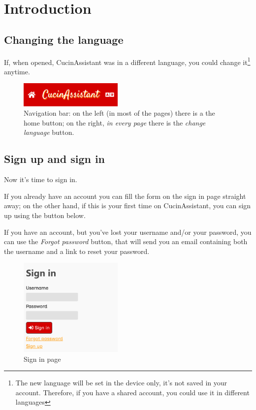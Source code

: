 \documentclass[12pt, a4paper]{report}
\begin{document}
    \chapter{Introduction}

    \section{Changing the language} \label{changelang}

    If, when opened, CucinAssistant was in a different language, you could change it\footnote{The new language will be set in the device only, it's
    not saved in your account. Therefore, if you have a shared account, you could use it in different languages} anytime.

    \begin{figure}[H]
        \centering
        \includegraphics[width=0.45\textwidth]{assets/nav.png}
        \caption{Navigation bar: on the left (in most of the pages) there is a the home button; on the right, \emph{in every page} there is the
        \emph{change language} button.}
    \end{figure}

    \section{Sign up and sign in}

    Now it's time to sign in.

    If you already have an account you can fill the form on the sign in page straight away; on the other hand, if this is your first time on
    CucinAssistant, you can sign up using the button below.

    If you have an account, but you've lost your username and/or your password, you can use the \emph{Forgot password} button, that will send you an
    email containing both the username and a link to reset your password.

    \begin{figure}[H]
        \centering
        \includegraphics[width=0.45\textwidth]{assets/en/signin.png}
        \caption{Sign in page}
    \end{figure}
\end{document}
